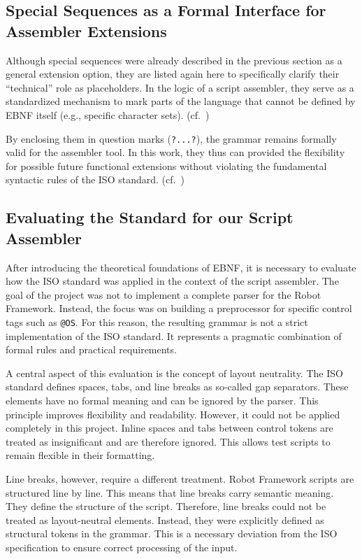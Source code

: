 \subsection{Special Sequences as a Formal Interface for Assembler Extensions}

Although special sequences were already described in the previous section as a general extension option, they are listed again here to specifically clarify their ``technical'' role as placeholders. In the logic of a script assembler, they serve as a standardized mechanism to mark parts of the language that cannot be defined by EBNF itself (e.g., specific character sets). (cf.~\cite[p.~VII]{ISO/IEC149771996InformationBNF})

By enclosing them in question marks (\texttt{?...?}), the grammar remains formally valid for the assembler tool. In this work, they thus can provided the flexibility for possible future functional extensions without violating the fundamental syntactic rules of the ISO standard. (cf.~\cite[p.~3]{ISO/IEC149771996InformationBNF})


\subsection{Evaluating the Standard for our Script Assembler}

After introducing the theoretical foundations of EBNF, it is necessary to evaluate how the ISO standard was applied in the context of the script assembler. The goal of the project was not to implement a complete parser for the Robot Framework. Instead, the focus was on building a preprocessor for specific control tags such as \texttt{@OS}. For this reason, the resulting grammar is not a strict implementation of the ISO standard. It represents a pragmatic combination of formal rules and practical requirements.

A central aspect of this evaluation is the concept of layout neutrality. The ISO standard defines spaces, tabs, and line breaks as so-called gap separators. These elements have no formal meaning and can be ignored by the parser. This principle improves flexibility and readability. However, it could not be applied completely in this project. Inline spaces and tabs between control tokens are treated as insignificant and are therefore ignored. This allows test scripts to remain flexible in their formatting.

Line breaks, however, require a different treatment. Robot Framework scripts are structured line by line. This means that line breaks carry semantic meaning. They define the structure of the script. Therefore, line breaks could not be treated as layout-neutral elements. Instead, they were explicitly defined as structural tokens in the grammar. This is a necessary deviation from the ISO specification to ensure correct processing of the input.

